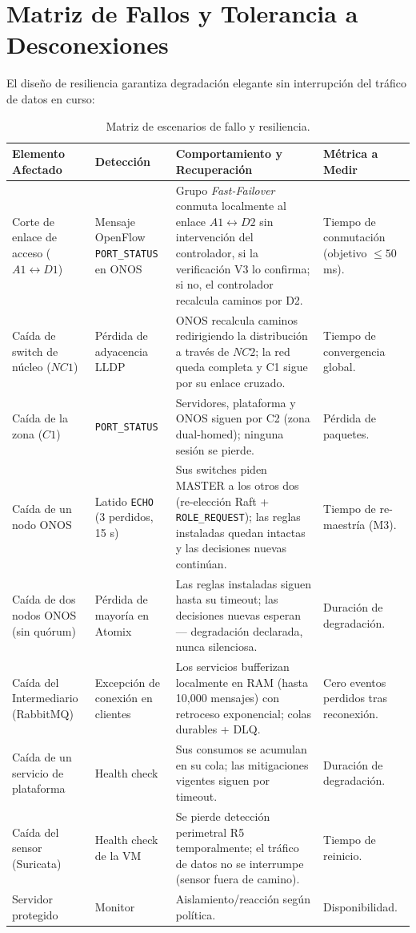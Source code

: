 \documentclass[11pt,a4paper]{report}
\begin{document}
\section{Matriz de Fallos y Tolerancia a Desconexiones}
El diseño de resiliencia garantiza degradación elegante sin interrupción del tráfico de datos en curso:

\begin{table}[h!]
\centering
\small
\begin{tabularx}{\linewidth}{p{2.8cm}p{3.0cm}Xp{2.6cm}}
\toprule
\textbf{Elemento Afectado} & \textbf{Detección} & \textbf{Comportamiento y Recuperación} & \textbf{Métrica a Medir} \\
\midrule
Corte de enlace de acceso ($A1 \leftrightarrow D1$) & Mensaje OpenFlow \texttt{PORT\_STATUS} en ONOS & Grupo \emph{Fast-Failover} conmuta localmente al enlace $A1 \leftrightarrow D2$ sin intervención del controlador, si la verificación V3 lo confirma; si no, el controlador recalcula caminos por D2. & Tiempo de conmutación (objetivo $\le 50$ ms). \\
Caída de switch de núcleo ($NC1$) & Pérdida de adyacencia LLDP & ONOS recalcula caminos redirigiendo la distribución a través de $NC2$; la red queda completa y C1 sigue por su enlace cruzado. & Tiempo de convergencia global. \\
Caída de la zona ($C1$) & \texttt{PORT\_STATUS} & Servidores, plataforma y ONOS siguen por C2 (zona dual-homed); ninguna sesión se pierde. & Pérdida de paquetes. \\
Caída de un nodo ONOS & Latido \texttt{ECHO} (3 perdidos, 15 s) & Sus switches piden MASTER a los otros dos (re-elección Raft + \texttt{ROLE\_REQUEST}); las reglas instaladas quedan intactas y las decisiones nuevas continúan. & Tiempo de re-maestría (M3). \\
Caída de dos nodos ONOS (sin quórum) & Pérdida de mayoría en Atomix & Las reglas instaladas siguen hasta su timeout; las decisiones nuevas esperan — degradación declarada, nunca silenciosa. & Duración de degradación. \\
Caída del Intermediario (RabbitMQ) & Excepción de conexión en clientes & Los servicios bufferizan localmente en RAM (hasta 10,000 mensajes) con retroceso exponencial; colas durables + DLQ. & Cero eventos perdidos tras reconexión. \\
Caída de un servicio de plataforma & Health check & Sus consumos se acumulan en su cola; las mitigaciones vigentes siguen por timeout. & Duración de degradación. \\
Caída del sensor (Suricata) & Health check de la VM & Se pierde detección perimetral R5 temporalmente; el tráfico de datos no se interrumpe (sensor fuera de camino). & Tiempo de reinicio. \\
Servidor protegido & Monitor & Aislamiento/reacción según política. & Disponibilidad. \\
\bottomrule
\end{tabularx}
\caption{Matriz de escenarios de fallo y resiliencia.}
\label{tab:fallos}
\end{table}
\end{document}
